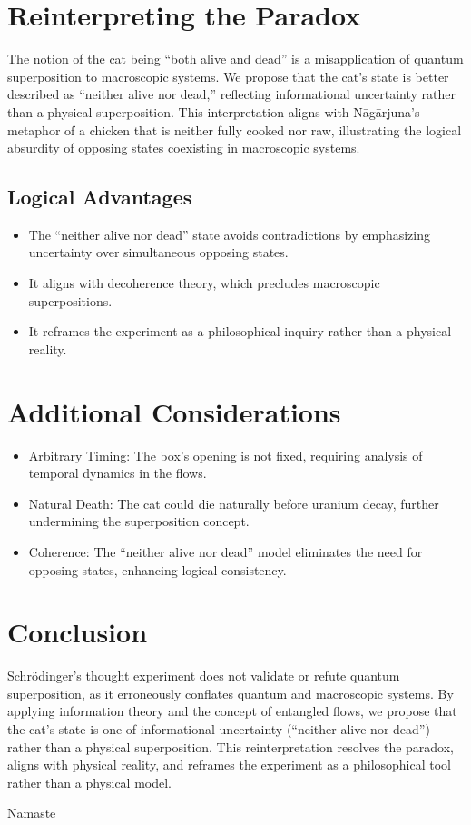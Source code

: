 \documentclass[12pt]{article}
\begin{document}
\section{Reinterpreting the Paradox}

The notion of the cat being ``both alive and dead'' is a misapplication of quantum superposition to macroscopic systems. We propose that the cat's state is better described as ``neither alive nor dead,'' reflecting informational uncertainty rather than a physical superposition. This interpretation aligns with Nāgārjuna's metaphor of a chicken that is neither fully cooked nor raw, illustrating the logical absurdity of opposing states coexisting in macroscopic systems.

\subsection{Logical Advantages}

\begin{itemize}
\item The ``neither alive nor dead'' state avoids contradictions by emphasizing uncertainty over simultaneous opposing states.
\item It aligns with decoherence theory, which precludes macroscopic superpositions.
\item It reframes the experiment as a philosophical inquiry rather than a physical reality.
\end{itemize}

\section{Additional Considerations}

\begin{itemize}
\item Arbitrary Timing: The box's opening is not fixed, requiring analysis of temporal dynamics in the flows.
\item Natural Death: The cat could die naturally before uranium decay, further undermining the superposition concept.
\item Coherence: The ``neither alive nor dead'' model eliminates the need for opposing states, enhancing logical consistency.
\end{itemize}

\section{Conclusion}

Schrödinger's thought experiment does not validate or refute quantum superposition, as it erroneously conflates quantum and macroscopic systems. By applying information theory and the concept of entangled flows, we propose that the cat's state is one of informational uncertainty (``neither alive nor dead'') rather than a physical superposition. This reinterpretation resolves the paradox, aligns with physical reality, and reframes the experiment as a philosophical tool rather than a physical model.

Namaste
\end{document}
